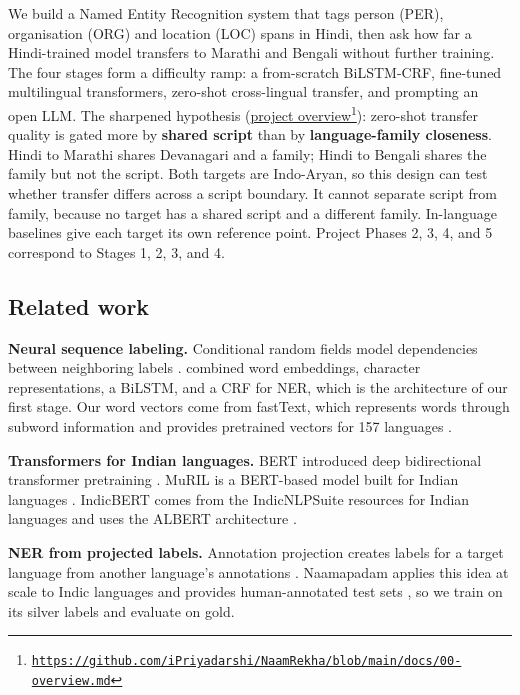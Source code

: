 \documentclass[10pt,twoside,a4paper]{article}
\begin{document}
We build a Named Entity Recognition system that tags person (PER), organisation (ORG) and location (LOC) spans in Hindi, then ask how far a Hindi-trained model transfers to Marathi and Bengali without further training. The four stages form a difficulty ramp: a from-scratch BiLSTM-CRF, fine-tuned multilingual transformers, zero-shot cross-lingual transfer, and prompting an open LLM. The sharpened hypothesis (\href{https://github.com/iPriyadarshi/NaamRekha/blob/main/docs/00-overview.md}{project overview}\footnote{\href{https://github.com/iPriyadarshi/NaamRekha/blob/main/docs/00-overview.md}{{\fontsize{8.1}{9.2}\selectfont\texttt{\mbox{https://}github.\allowbreak{}com/\allowbreak{}iPriyadarshi/\allowbreak{}NaamRekha/\allowbreak{}blob/\allowbreak{}main/\allowbreak{}docs/\allowbreak{}00-\allowbreak{}overview.\allowbreak{}md}}}}): zero-shot transfer quality is gated more by \textbf{shared script} than by \textbf{language-family closeness}. Hindi to Marathi shares Devanagari and a family; Hindi to Bengali shares the family but not the script. Both targets are Indo-Aryan, so this design can test whether transfer differs across a script boundary. It cannot separate script from family, because no target has a shared script and a different family. In-language baselines give each target its own reference point. Project Phases 2, 3, 4, and 5 correspond to Stages 1, 2, 3, and 4.

\subsection{Related work}

\textbf{Neural sequence labeling.} Conditional random fields model dependencies between neighboring labels \citep{lafferty2001}. \citet{lample2016} combined word embeddings, character representations, a BiLSTM, and a CRF for NER, which is the architecture of our first stage. Our word vectors come from fastText, which represents words through subword information \citep{bojanowski2017} and provides pretrained vectors for 157 languages \citep{grave2018}.

\textbf{Transformers for Indian languages.} BERT introduced deep bidirectional transformer pretraining \citep{devlin2019}. MuRIL is a BERT-based model built for Indian languages \citep{khanuja2021}. IndicBERT comes from the IndicNLPSuite resources for Indian languages \citep{kakwani2020} and uses the ALBERT architecture \citep{lan2019}.

\textbf{NER from projected labels.} Annotation projection creates labels for a target language from another language's annotations \citep{ni2017}. Naamapadam applies this idea at scale to Indic languages and provides human-annotated test sets \citep{mhaske2023}, so we train on its silver labels and evaluate on gold.
\end{document}
